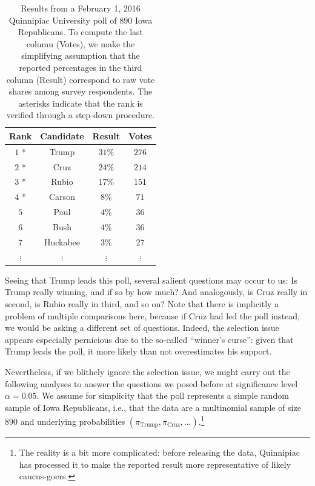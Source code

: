 \documentclass[11pt]{article}
\begin{document}
\begin{table}[htbp]
\begin{center}
\begin{tabular}{c c c c}
	\hline
	Rank & Candidate & Result & Votes \\
	\hline
	$1$ * & Trump & $31\%$ & $276$ \\
	$2$ * & Cruz & $24\%$ & $214$ \\
	$3$ * & Rubio & $17\%$ & $151$ \\
	$4$ * & Carson & $8\%$ & $71$ \\
	$5$ & Paul & $4\%$ & $36$ \\
	$6$ & Bush & $4\%$ & $36$ \\
	$7$ & Huckabee & $3\%$ & $27$ \\
	$\vdots$ & $\vdots$ & $\vdots $ & $\vdots$ \\
	\hline
\end{tabular}
\end{center}
\caption{Results from a February 1, 2016 Quinnipiac University poll of $890$ Iowa Republicans. To compute the last column (Votes), we make the simplifying assumption that the reported percentages in the third column (Result) correspond to raw vote shares among survey respondents. The asterisks indicate that the rank is verified through a step-down procedure.}
\label{tbl:poll}
\end{table}

Seeing that Trump leads this poll, several salient questions may occur to us: Is Trump really winning, and if so by how much? And analogously, is Cruz really in second, is Rubio really in third, and so on? Note that there is implicitly a problem of multiple comparisons here, because if Cruz had led the poll instead, we would be asking a different set of questions. Indeed, the selection issue appears especially pernicious due to the so-called ``winner's curse'': given that Trump leads the poll, it more likely than not overestimates his support.

Nevertheless, if we blithely ignore the selection issue, we might carry out the following analyses to answer the questions we posed before at significance level $\alpha = 0.05$. We assume for simplicity that the poll represents a simple random sample of Iowa Republicans, i.e., that the data are a multinomial sample of size $890$ and underlying probabilities $\left(\pi_{\text{Trump}}, \pi_{\text{Cruz}}, \ldots\right)$.\footnote{The reality is a bit more complicated: before releasing the data, Quinnipiac has processed it to make the reported result more representative of likely caucus-goers.}
\end{document}

